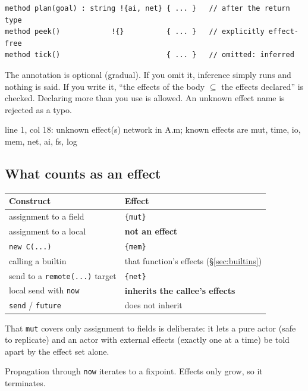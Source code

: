 \documentclass[11pt,a4paper]{article}
\newcommand{\eff}[1]{\texttt{\{#1\}}}
\begin{document}
\begin{lstlisting}
method plan(goal) : string !{ai, net} { ... }   // after the return type
method peek()            !{}          { ... }   // explicitly effect-free
method tick()                         { ... }   // omitted: inferred
\end{lstlisting}

The annotation is optional (gradual). If you omit it, inference simply runs and
nothing is said. If you write it, ``the effects of the body $\subseteq$ the
effects declared'' is checked. Declaring more than you use is allowed. An
unknown effect name is rejected as a typo.

\begin{term}
 line 1, col 18: unknown effect(s) network in A.m;
  known effects are mut, time, io, mem, net, ai, fs, log
\end{term}

\subsection{What counts as an effect}

\begin{center}
\small
\begin{tabular}{@{}ll@{}}
\toprule
Construct & Effect \\
\midrule
assignment to a field        & \eff{mut} \\
assignment to a local        & \textbf{not an effect} \\
\texttt{new C(...)}          & \eff{mem} \\
calling a builtin            & that function's effects (\S\ref{sec:builtins}) \\
send to a \texttt{remote(...)} target & \eff{net} \\
local send with \texttt{now} & \textbf{inherits the callee's effects} \\
\texttt{send} / \texttt{future} & does not inherit \\
\bottomrule
\end{tabular}
\end{center}

That \texttt{mut} covers only assignment to fields is deliberate: it lets a
pure actor (safe to replicate) and an actor with external effects (exactly one
at a time) be told apart by the effect set alone.

Propagation through \texttt{now} iterates to a fixpoint. Effects only grow, so
it terminates.
\end{document}
